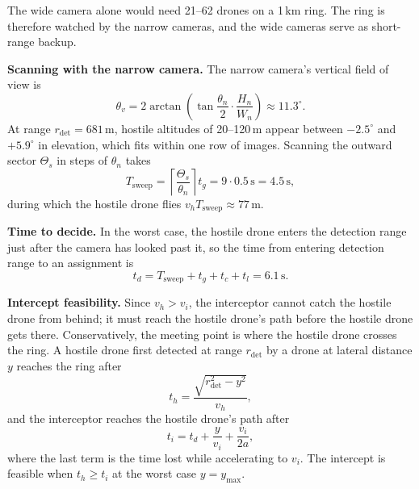 \documentclass{article}
\begin{document}
The wide camera alone would need 21--62 drones on a 1\,km ring. The ring is
therefore watched by the narrow cameras, and the wide cameras serve as
short-range backup.

\textbf{Scanning with the narrow camera.} The narrow camera's vertical field of
view is
\begin{equation}
  \theta_v = 2\arctan\!\left(\tan\frac{\theta_n}{2}\cdot\frac{H_n}{W_n}\right)
  \approx 11.3^\circ .
  \label{eq:vfov}
\end{equation}
At range $r_{\mathrm{det}} = 681$\,m, hostile altitudes of 20--120\,m appear
between $-2.5^\circ$ and $+5.9^\circ$ in elevation, which fits within one row
of images. Scanning the outward sector $\Theta_s$ in steps of $\theta_n$ takes
\begin{equation}
  T_{\mathrm{sweep}} = \left\lceil \frac{\Theta_s}{\theta_n} \right\rceil t_g
  = 9 \cdot 0.5\,\mathrm{s} = 4.5\,\mathrm{s},
  \label{eq:sweep}
\end{equation}
during which the hostile drone flies $v_h T_{\mathrm{sweep}} \approx 77$\,m.

\textbf{Time to decide.} In the worst case, the hostile drone enters the
detection range just after the camera has looked past it, so the time from
entering detection range to an assignment is
\begin{equation}
  t_d = T_{\mathrm{sweep}} + t_g + t_c + t_l = 6.1\,\mathrm{s}.
  \label{eq:delay}
\end{equation}

\textbf{Intercept feasibility.} Since $v_h > v_i$, the interceptor cannot catch
the hostile drone from behind; it must reach the hostile drone's path before
the hostile drone gets there. Conservatively, the meeting point is where the
hostile drone crosses the ring. A hostile drone first detected at range
$r_{\mathrm{det}}$ by a drone at lateral distance $y$ reaches the ring after
\begin{equation}
  t_h = \frac{\sqrt{r_{\mathrm{det}}^2 - y^2}}{v_h},
  \label{eq:th}
\end{equation}
and the interceptor reaches the hostile drone's path after
\begin{equation}
  t_i = t_d + \frac{y}{v_i} + \frac{v_i}{2a},
  \label{eq:ti}
\end{equation}
where the last term is the time lost while accelerating to $v_i$. The
intercept is feasible when $t_h \geq t_i$ at the worst case $y = y_{\max}$.
\end{document}

